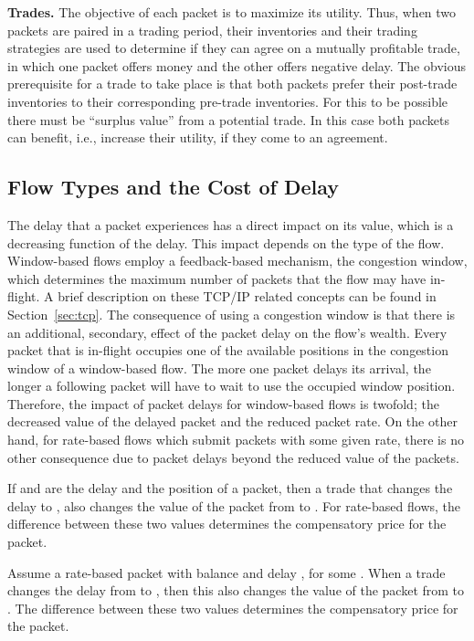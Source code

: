 \documentclass[letterpaper,10pt]{llncs}
\begin{document}
\textbf{Trades.}
The objective of each packet is to maximize its utility.
Thus, when two packets are paired in a trading period, their inventories and their
trading strategies are used to determine if they can agree on a mutually profitable trade,
in which one packet offers money and the other offers negative delay.
The obvious prerequisite for a trade to take place is that both packets prefer their
post-trade inventories to their corresponding pre-trade inventories.
For this to be possible there must be ``surplus value'' from a potential trade.
In this case both packets can benefit, i.e., increase their utility, if they come to
an agreement.

\subsection{Flow Types and the Cost of Delay}
The delay that a packet experiences has a direct impact on its value, which is a decreasing function of the delay. 
This impact depends on the type of the flow. 
Window-based flows employ a feedback-based mechanism, the congestion window, which determines the maximum number 
of packets that the flow may have in-flight. A brief description on these TCP/IP related concepts can be found in Section~\ref{sec:tcp}.
The consequence of using a congestion window is that there is an additional, secondary, effect of the packet delay on the flow's wealth. Every packet that is in-flight
occupies one of the available positions in the congestion window of a window-based flow. The more one
packet delays its arrival, the longer a following packet will have to wait to use the occupied window position. Therefore, the impact of packet delays for window-based flows is twofold; the decreased value of the delayed packet
and the reduced packet rate. 
On the other hand, for rate-based flows which submit packets with some given rate, there is no other consequence due to packet delays beyond the reduced value of 
the packets.

If  and  are the delay and the position of a packet, 
then a trade that changes the delay to , also changes the 
value of the packet from  to . For rate-based flows, the difference
between these two values determines the compensatory price for the packet.

Assume a rate-based packet  with balance  and 
delay , for some .
When a trade changes the delay from  to , then this 
also changes the value of the packet from  to . 
The difference between these two values determines the compensatory price 
 for the packet.
\end{document}

